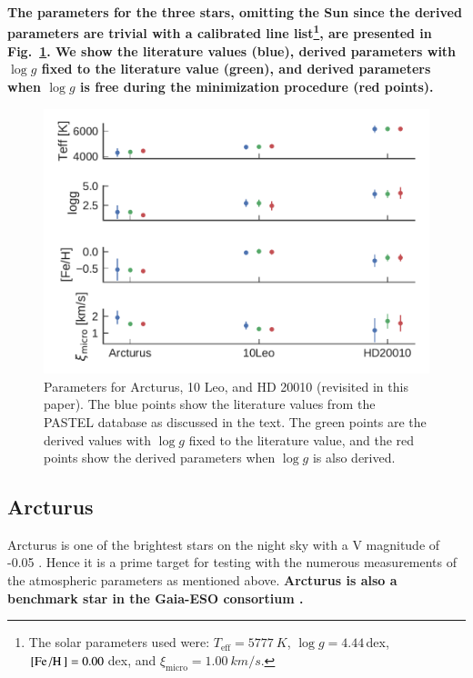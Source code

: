 \documentclass{aa}
\begin{document}
{\bf The parameters for the three stars, omitting the Sun since the derived
parameters are trivial with a calibrated line list\footnote{The solar parameters
used were: $T_\mathrm{eff}=\SI{5777}{K}$, $\log g=4.44\,$dex,
$[\ion{Fe}/\ion{H}]=0.00\,$dex, and $\xi_\mathrm{micro}=\SI{1.00}{km/s}$.}, are
presented in Fig.~\ref{fig:parameters}. We show the literature values (blue),
derived parameters with $\log g$ fixed to the literature value (green), and
derived parameters when $\log g$ is free during the minimization procedure (red
points).}

\begin{figure}[htpb!]
    \centering
    \includegraphics[width=1.0\linewidth]{figures/parameters.pdf}
    \caption{Parameters for Arcturus, 10 Leo, and HD 20010 (revisited in this
             paper). The blue points show the literature values from the PASTEL
             database as discussed in the text. The green points are the
             derived values with $\log g$ fixed to the literature value, and the
             red points show the derived parameters when $\log g$ is also
             derived.}
    \label{fig:parameters}
\end{figure}


\subsection{Arcturus}
\label{sec:arcturus}

Arcturus is one of the brightest stars on the night sky with a V magnitude of
-0.05 \citep{Ducati2002}. Hence it is a prime target for testing with the
numerous measurements of the atmospheric parameters as mentioned above. {\bf
Arcturus is also a benchmark star in the Gaia-ESO consortium
\citep{Jofre2014,Smiljanic2014}.}
\end{document}
